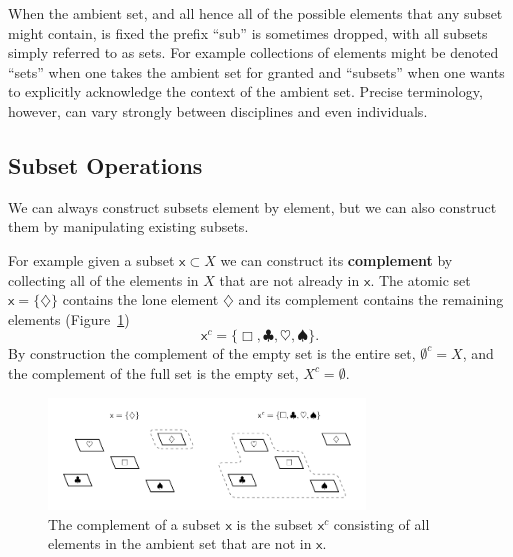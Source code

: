 \documentclass[
  letterpaper,
  DIV=11,
  numbers=noendperiod]{scrartcl}
\begin{document}
When the ambient set, and all hence all of the possible elements that
any subset might contain, is fixed the prefix ``sub'' is sometimes
dropped, with all subsets simply referred to as sets. For example
collections of elements might be denoted ``sets'' when one takes the
ambient set for granted and ``subsets'' when one wants to explicitly
acknowledge the context of the ambient set. Precise terminology,
however, can vary strongly between disciplines and even individuals.

\hypertarget{subset-operations}{%
\subsection{Subset Operations}\label{subset-operations}}

We can always construct subsets element by element, but we can also
construct them by manipulating existing subsets.

For example given a subset \(\mathsf{x} \subset X\) we can construct its
\textbf{complement} by collecting all of the elements in \(X\) that are
not already in \(\mathsf{x}\). The atomic set
\(\mathsf{x} = \{ \diamondsuit \}\) contains the lone element
\(\diamondsuit\) and its complement contains the remaining elements
(Figure~\ref{fig-complement}) \[
\mathsf{x}^{c} = \{ \Box, \clubsuit, \heartsuit, \spadesuit \}.
\] By construction the complement of the empty set is the entire set,
\(\emptyset^{c} = X\), and the complement of the full set is the empty
set, \(X^{c} = \emptyset\).

\begin{figure}

{\centering \includegraphics[width=0.75\textwidth,height=\textheight]{figures/complement/complement.pdf}

}

\caption{\label{fig-complement}The complement of a subset \(\mathsf{x}\)
is the subset \(\mathsf{x}^{c}\) consisting of all elements in the
ambient set that are not in \(\mathsf{x}\).}

\end{figure}
\end{document}
